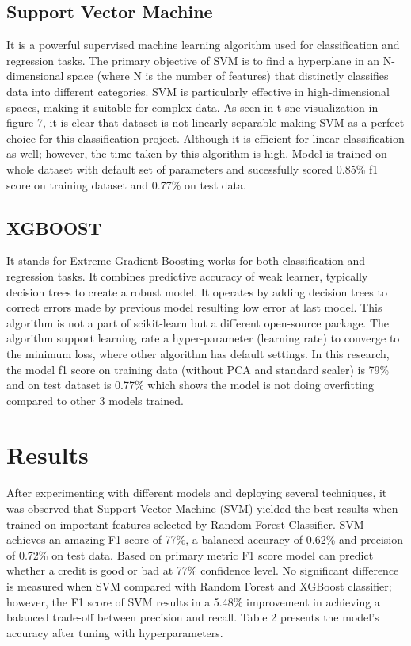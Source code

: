 \documentclass[10pt]{article}
\begin{document}
\begin{multicols}{2}
\subsection{Support Vector Machine}
It is a powerful supervised machine learning algorithm used for classification and regression tasks. The primary objective of SVM is to find a hyperplane in an N-dimensional space (where N is the number of features) that distinctly classifies data into different categories. SVM is particularly effective in high-dimensional spaces, making it suitable for complex data. As seen in t-sne visualization in figure 7, it is clear that dataset is not linearly separable making SVM as a perfect choice for this classification project. Although it is efficient for linear classification as well; however, the time taken by this algorithm is high. Model is trained on whole dataset with default set of parameters and sucessfully scored 0.85\% f1 score on training dataset and 0.77\% on test data. 

\subsection{XGBOOST}
It stands for Extreme Gradient Boosting works for both classification and regression tasks. It combines predictive accuracy of weak learner, typically decision trees to create a robust model. It operates by adding decision trees to correct errors made by previous model resulting low error at last model. This algorithm is not a part of scikit-learn but a different open-source package. The algorithm support learning rate a hyper-parameter (learning rate) to converge to the minimum loss, where other algorithm has default settings. 
In this research, the model f1 score on training data (without PCA and standard scaler) is 79\% and on test dataset is 0.77\% which shows the model is not doing overfitting compared to other 3 models trained. 



\section{Results}
After experimenting with different models and deploying several techniques, it was observed that Support Vector Machine (SVM) yielded the best results when trained on important features selected by Random Forest Classifier. SVM achieves an amazing F1 score of 77\%, a balanced accuracy of 0.62\% and precision of 0.72\% on test data. Based on primary metric F1 score model can predict whether a credit is good or bad at 77\% confidence level. 
No significant difference is measured when SVM compared with Random Forest and XGBoost classifier; however, the F1 score of SVM results in a 5.48\% improvement in achieving a balanced trade-off between precision and recall. Table 2 presents the model’s accuracy after tuning with hyperparameters.


\end{multicols}
\end{document}
